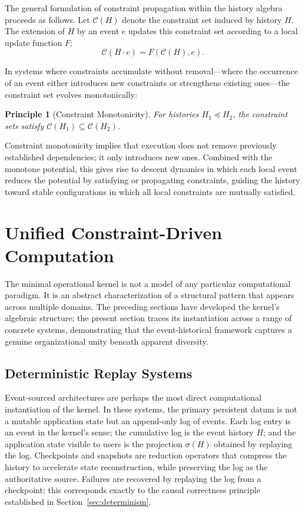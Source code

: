 \documentclass[12pt]{article}
\newtheorem{principle}{Principle}
\begin{document}
The general formulation of constraint propagation within the history algebra proceeds as follows. Let $\mathcal{C}(H)$ denote the constraint set induced by history $H$. The extension of $H$ by an event $e$ updates this constraint set according to a local update function $F$:
\[
\mathcal{C}(H \cdot e) = F(\mathcal{C}(H), e).
\]

In systems where constraints accumulate without removal---where the occurrence of an event either introduces new constraints or strengthens existing ones---the constraint set evolves monotonically:

\begin{principle}[Constraint Monotonicity]
For histories $H_1 \preceq H_2$, the constraint sets satisfy $\mathcal{C}(H_1) \subseteq \mathcal{C}(H_2)$.
\end{principle}

Constraint monotonicity implies that execution does not remove previously established dependencies; it only introduces new ones. Combined with the monotone potential, this gives rise to descent dynamics in which each local event reduces the potential by satisfying or propagating constraints, guiding the history toward stable configurations in which all local constraints are mutually satisfied.


\section{Unified Constraint-Driven Computation}
\label{sec:unified}

The minimal operational kernel is not a model of any particular computational paradigm. It is an abstract characterization of a structural pattern that appears across multiple domains. The preceding sections have developed the kernel's algebraic structure; the present section traces its instantiation across a range of concrete systems, demonstrating that the event-historical framework captures a genuine organizational unity beneath apparent diversity.

\subsection{Deterministic Replay Systems}

Event-sourced architectures \cite{fowler2005, kleppmann2017} are perhaps the most direct computational instantiation of the kernel. In these systems, the primary persistent datum is not a mutable application state but an append-only log of events. Each log entry is an event in the kernel's sense; the cumulative log is the event history $H$; and the application state visible to users is the projection $\sigma(H)$ obtained by replaying the log. Checkpoints and snapshots are reduction operators that compress the history to accelerate state reconstruction, while preserving the log as the authoritative source. Failures are recovered by replaying the log from a checkpoint; this corresponds exactly to the causal correctness principle established in Section~\ref{sec:determinism}.
\end{document}
